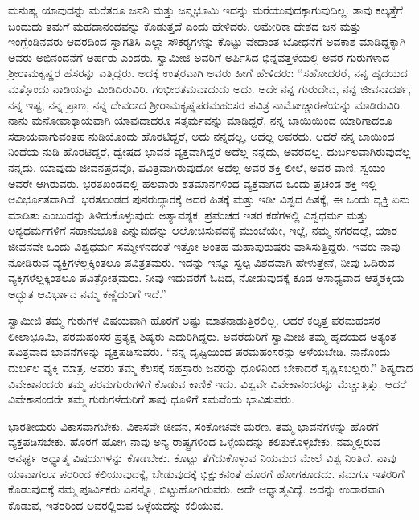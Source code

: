  ಮನುಷ್ಯ ಯಾವುದನ್ನು ಮರೆತರೂ ಜನನಿ ಮತ್ತು ಜನ್ಮಭೂಮಿ ಇದನ್ನು ಮರೆಯುವುದಕ್ಕಾಗುವುದಿಲ್ಲ. ತಾವು ಕಲ್ಕತ್ತೆಗೆ ಬಂದುದು ತಮಗೆ ಮಹದಾನಂದವನ್ನು ಕೊಡುತ್ತದೆ ಎಂದು ಹೇಳಿದರು. ಅಮೇರಿಕಾ ದೇಶದ ಜನ ಮತ್ತು ಇಂಗ್ಲೆಂಡಿನವರು ಆದರದಿಂದ ಸ್ವಾಗತಿಸಿ ಎಲ್ಲಾ ಸೌಕರ‍್ಯಗಳನ್ನು ಕೊಟ್ಟು ವೇದಾಂತ ಬೋಧನೆಗೆ ಅವಕಾಶ ಮಾಡಿದ್ದಕ್ಕಾಗಿ ಅವರು ಅಭಿನಂದನೆಗೆ ಅರ್ಹರು ಎಂದರು. ಸ್ವಾಮೀಜಿ ಅವರಿಗೆ ಅರ್ಪಿಸಿದ ಭಿನ್ನವತ್ತಳೆಯಲ್ಲಿ ಅವರ ಗುರುಗಳಾದ ಶ‍್ರೀರಾಮಕೃಷ್ಣರ ಹೆಸರನ್ನು ಎತ್ತಿದ್ದರು. ಅದಕ್ಕೆ ಉತ್ತರವಾಗಿ ಅವರು ಹೀಗೆ ಹೇಳಿದರು: “ಸಹೋದರರೆ, ನನ್ನ ಹೃದಯದ ಮತ್ತೊಂದು ನಾಡಿಯನ್ನು ಮಿಡಿದಿರುವಿರಿ. ಗಂಭೀರತಮವಾದುದು ಅದು. ಅದೇ ನನ್ನ ಗುರುದೇವ, ನನ್ನ ಜೀವನಾದರ್ಶ, ನನ್ನ ಇಷ್ಟ, ನನ್ನ ಪ್ರಾಣ, ನನ್ನ ದೇವರಾದ ಶ‍್ರೀರಾಮಕೃಷ್ಣಪರಮಹಂಸರ ಪವಿತ್ರ ನಾಮೋಚ್ಚಾರಣೆಯನ್ನು ಮಾಡಿರುವಿರಿ. ನಾನು ಮನೋವಾಕ್ಕಾಯವಾಗಿ ಯಾವುದಾದರೂ ಸತ್ಕರ್ಮವನ್ನು ಮಾಡಿದ್ದರೆ, ನನ್ನ ಬಾಯಿಯಿಂದ ಯಾರಿಗಾದರೂ ಸಹಾಯವಾಗುವಂತಹ ನುಡಿಯೊಂದು ಹೊರಟಿದ್ದರೆ, ಅದು ನನ್ನದಲ್ಲ, ಅದೆಲ್ಲ ಅವರದು. ಆದರೆ ನನ್ನ ಬಾಯಿಂದ ನಿಂದೆಯ ನುಡಿ ಹೊರಟಿದ್ದರೆ, ದ್ವೇಷದ ಭಾವನೆ ವ್ಯಕ್ತವಾಗಿದ್ದರೆ ಅದೆಲ್ಲ ನನ್ನದು, ಅವರದಲ್ಲ. ದುರ್ಬಲವಾಗಿರುವುದೆಲ್ಲ ನನ್ನದು. ಯಾವುದು ಜೀವನಪ್ರದವೊ, ಪವಿತ್ರವಾಗಿರುವುದೋ ಅದೆಲ್ಲ ಅವರ ಶಕ್ತಿ ಲೀಲೆ, ಅವರ ವಾಣಿ. ಸ್ವಯಂ ಅವರೇ ಆಗಿರುವರು. ಭರತಖಂಡದಲ್ಲಿ ಹಲವಾರು ಶತಮಾನಗಳಿಂದ ವ್ಯಕ್ತವಾಗದ ಒಂದು ಪ್ರಚಂಡ ಶಕ್ತಿ ಇಲ್ಲಿ ಆವಿರ್ಭೂತವಾಗಿದೆ. ಭರತಖಂಡದ ಪುನರುದ್ಧಾರಕ್ಕೆ ಅದರ ಹಿತಕ್ಕೆ ಮತ್ತು ಇಡೀ ವಿಶ್ವದ ಹಿತಕ್ಕೆ, ಈ ಒಂದು ವ್ಯಕ್ತಿ ಏನು ಮಾಡಿತು ಎಂಬುದನ್ನು ತಿಳಿದುಕೊಳ್ಳುವುದು ಅತ್ಯಾವಶ್ಯಕ. ಪ್ರಪಂಚದ ಇತರ ಕಡೆಗಳಲ್ಲಿ ವಿಶ್ವಧರ್ಮ ಮತ್ತು ಅನ್ಯಧರ್ಮಗಳಿಗೆ ಸಹಾನುಭೂತಿ ಎನ್ನುವುದನ್ನು ಆಲೋಚಿಸುವದಕ್ಕೆ ಮುಂಚೆಯೇ, ಇಲ್ಲೆ, ನಮ್ಮ ನಗರದಲ್ಲೆ, ಯಾರ ಜೀವನವೇ ಒಂದು ವಿಶ್ವಧರ್ಮ ಸಮ್ಮೇಳನದಂತೆ ಇತ್ತೋ ಅಂತಹ ಮಹಾಪುರುಷರು ವಾಸಿಸುತ್ತಿದ್ದರು. ಇವರು ನಾವು ನೋಡಿರುವ ವ್ಯಕ್ತಿಗಳೆಲ್ಲಕ್ಕಿಂತಲೂ ಪವಿತ್ರತಮರು. ಇದನ್ನು ಇನ್ನೂ ಸ್ವಲ್ಪ ವಿಶದವಾಗಿ ಹೇಳುತ್ತೇನೆ, ನೀವು ಓದಿರುವ ವ್ಯಕ್ತಿಗಳೆಲ್ಲಕ್ಕಿಂತಲೂ ಪವಿತ್ರೋತ್ತಮರು. ನೀವು ಇದುವರೆಗೆ ಓದಿದ, ನೋಡುವುದಕ್ಕೆ ಕೂಡ ಅಸಾಧ್ಯವಾದ ಆತ್ಮಶಕ್ತಿಯ ಅದ್ಭುತ ಆವಿರ್ಭಾವ ನಮ್ಮ ಕಣ್ಣೆದುರಿಗೆ ಇದೆ.” 

 ಸ್ವಾಮೀಜಿ ತಮ್ಮ ಗುರುಗಳ ವಿಷಯವಾಗಿ ಹೊರಗೆ ಅಷ್ಟು ಮಾತನಾಡುತ್ತಿರಲಿಲ್ಲ. ಆದರೆ ಕಲ್ಕತ್ತ ಪರಮಹಂಸರ ಲೀಲಾಭೂಮಿ, ಪರಮಹಂಸರ ಪ್ರತ್ಯಕ್ಷ ಶಿಷ್ಯರು ಎದುರಿಗಿದ್ದರು. ಅವರೆದುರಿಗೆ ಸ್ವಾಮೀಜಿ ತಮ್ಮ ಹೃದಯದ ಅತ್ಯಂತ ಪವಿತ್ರವಾದ ಭಾವನೆಗಳನ್ನು ವ್ಯಕ್ತಪಡಿಸುವರು. “ನನ್ನ ದೃಷ್ಟಿಯಿಂದ ಪರಮಹಂಸರನ್ನು ಅಳೆಯಬೇಡಿ. ನಾನೊಂದು ದುರ್ಬಲ ವ್ಯಕ್ತಿ ಮಾತ್ರ. ಅವರು ತಮ್ಮ ಕೆಲಸಕ್ಕೆ ಸಹಸ್ರಾರು ಜನರನ್ನು ಧೂಳಿನಿಂದ ಬೇಕಾದರೆ ಸೃಷ್ಟಿಸಬಲ್ಲರು.” ಶಿಷ್ಯರಾದ ವಿವೇಕಾನಂದರು ತಮ್ಮ ಪರಮಗುರುಗಳಿಗೆ ಕೊಡುವ ಕಾಣಿಕೆ ಇದು. ವಿಶ್ವವೇ ವಿವೇಕಾನಂದರನ್ನು ಮೆಚ್ಚುತ್ತಿತ್ತು. ಆದರೆ ವಿವೇಕಾನಂದರೇ ತಮ್ಮ ಗುರುಗಳೆದುರಿಗೆ ತಾವು ಧೂಳಿಗೆ ಸಮವೆಂದು ಭಾವಿಸುವರು. 

 ಭಾರತೀಯರು ವಿಕಾಸವಾಗಬೇಕು. ವಿಕಾಸವೇ ಜೀವನ, ಸಂಕೋಚವೇ ಮರಣ. ತಮ್ಮ ಭಾವನೆಗಳನ್ನು ಹೊರಗೆ ವ್ಯಕ್ತಪಡಿಸಬೇಕು. ಹೊರಗೆ ಹೋಗಿ ನಾವು ಅನ್ಯ ರಾಷ್ಟ್ರಗಳಿಂದ ಒಳ್ಳೆಯದನ್ನು ಕಲಿತುಕೊಳ್ಳಬೇಕು. ನಮ್ಮಲ್ಲಿರುವ ಅನರ್ಘ್ಯ ಅಧ್ಯಾತ್ಮ ವಿಷಯಗಳನ್ನು ಕೊಡಬೇಕು. ಕೊಟ್ಟು ತೆಗೆದುಕೊಳ್ಳುವ ನಿಯಮದ ಮೇಲೆ ವಿಶ್ವ ನಿಂತಿದೆ. ನಾವು ಯಾವಾಗಲೂ ಪರರಿಂದ ಕಲಿಯುವುದಕ್ಕೆ, ಬೇಡುವುದಕ್ಕೆ ಭಿಕ್ಷುಕನಂತೆ ಹೊರಗೆ ಹೋಗಕೂಡದು. ನಮಗೂ ಇತರರಿಗೆ ಕೊಡುವುದಕ್ಕೆ ನಮ್ಮ ಪೂರ್ವಿಕರು ಏನನ್ನೊ, ಬಿಟ್ಟುಹೋಗಿರುವರು. ಅದೇ ಆಧ್ಯಾತ್ಮವಿದ್ಯೆ. ಅದನ್ನು ಉದಾರವಾಗಿ ಕೊಡುವ, ಇತರರಿಂದ ಅವರಲ್ಲಿರುವ ಒಳ್ಳೆಯದನ್ನು ಕಲಿಯುವ. 

